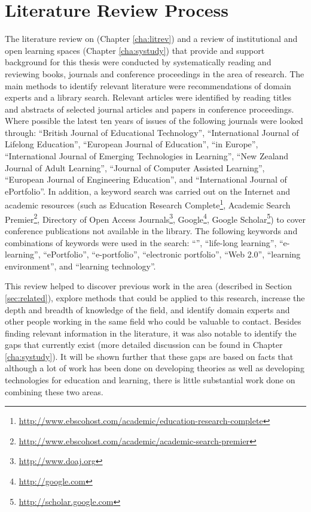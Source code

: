 \section{Literature Review Process}
The literature review on \LLLs (Chapter \ref{cha:litrev}) and a review of
institutional and open learning spaces (Chapter \ref{cha:systudy}) that provide
and support background for this thesis were conducted by systematically reading
and reviewing books, journals and conference proceedings in the area of
research. The main methods to identify relevant literature were recommendations
of domain experts and a library search. Relevant articles were identified by
reading titles and abstracts of selected journal articles and papers in
conference proceedings. Where possible the latest ten years of issues of the
following journals were looked through: ``British Journal of Educational
Technology'', ``International Journal of Lifelong Education'', ``European
Journal of Education'', ``\LLLc in Europe'', ``International Journal of Emerging
Technologies in Learning'', ``New Zealand Journal of Adult Learning'', ``Journal
of Computer Assisted Learning'', ``European Journal of Engineering Education'',
and ``International Journal of ePortfolio''. In addition, a keyword search was
carried out on the Internet and academic resources (such as Education Research
Complete\footnote{\url{http://www.ebscohost.com/academic/education-research-complete}},
Academic Search
Premier\footnote{\url{http://www.ebscohost.com/academic/academic-search-premier}},
Directory of Open Access Journals\footnote{\url{http://www.doaj.org}},
Google\footnote{\url{http://google.com}}, Google
Scholar\footnote{\url{http://scholar.google.com}}) to cover conference
publications not available in the library. The following keywords and
combinations of keywords were used in the search: ``\LLLsn'', ``life-long
learning'', ``e-learning'', ``ePortfolio'', ``e-portfolio'', ``electronic
portfolio'', ``Web 2.0'', ``learning environment'', and ``learning
technology''.

This review helped to discover previous work in the area (described in Section
\ref{sec:related}), explore methods that could be applied to this research,
increase the depth and breadth of knowledge of the field, and identify domain
experts and other people working in the same field who could be valuable to
contact. Besides finding relevant information in the literature, it was also
notable to identify the gaps that currently exist (more detailed discussion can
be found in Chapter \ref{cha:systudy}). It will be shown further that these gaps
are based on facts that although a lot of work has been done on developing \LLLs
theories as well as developing technologies for education and learning, there is
little substantial work done on combining these two areas.

